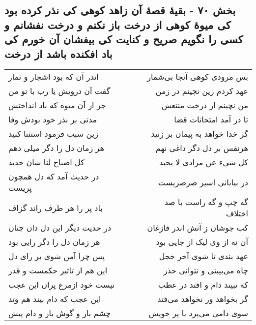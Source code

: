 \begin{center}
\section*{بخش ۷۰ - بقیهٔ قصهٔ آن زاهد کوهی کی نذر کرده بود کی میوهٔ کوهی از درخت باز نکنم و درخت نفشانم و کسی را نگویم صریح و کنایت کی بیفشان آن خورم کی باد افکنده باشد  از درخت}
\label{sec:sh070}
\begin{longtable}{l p{0.5cm} r}
اندر آن که بود اشجار و ثمار
&&
بس مرودی کوهی آنجا بی‌شمار
\\
گفت آن درویش یا رب با تو من
&&
عهد کردم زین نچینم در زمن
\\
جز از آن میوه که باد انداختش
&&
من نچینم از درخت منتعش
\\
مدتی بر نذر خود بودش وفا
&&
تا در آمد امتحانات قضا
\\
زین سبب فرمود استثنا کنید
&&
گر خدا خواهد به پیمان بر زنید
\\
هر زمان دل را دگر میلی دهم
&&
هرنفس بر دل دگر داغی نهم
\\
کل اصباح لنا شان جدید
&&
کل شیء عن مرادی لا یحید
\\
در حدیث آمد که دل همچون پریست
&&
در بیابانی اسیر صرصریست
\\
باد پر را هر طرف راند گزاف
&&
گه چپ و گه راست با صد اختلاف
\\
در حدیث دیگر این دل دان چنان
&&
کب جوشان ز آتش اندر قازغان
\\
هر زمان دل را دگر رایی بود
&&
آن نه از وی لیک از جایی بود
\\
پس چرا آمن شوی بر رای دل
&&
عهد بندی تا شوی آخر خجل
\\
این هم از تاثیر حکمست و قدر
&&
چاه می‌بیینی و نتوانی حذر
\\
نیست خود ازمرغ پران این عجب
&&
که نبیند دام و افتد در عطب
\\
این عجب که دام بیند هم وتد
&&
گر بخواهد ور نخواهد می‌فتد
\\
چشم باز و گوش باز و دام پیش
&&
سوی دامی می‌پرد با پر خویش
\\
\end{longtable}
\end{center}
